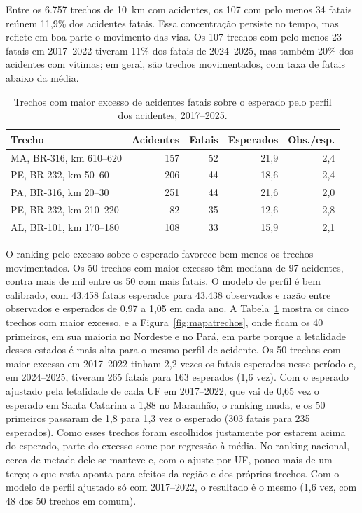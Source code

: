 \documentclass[12pt]{article}
\begin{document}
Entre os 6.757 trechos de 10~km com acidentes, os 107 com pelo menos 34 fatais reúnem 11,9\% dos acidentes fatais. Essa concentração persiste no tempo, mas reflete em boa parte o movimento das vias. Os 107 trechos com pelo menos 23 fatais em 2017--2022 tiveram 11\% dos fatais de 2024--2025, mas também 20\% dos acidentes com vítimas; em geral, são trechos movimentados, com taxa de fatais abaixo da média.

\begin{table}[ht]
\centering
\caption{Trechos com maior excesso de acidentes fatais sobre o esperado pelo perfil dos acidentes, 2017--2025.}
\label{tab:excesso}
\begin{tabular}{lrrrr}
\toprule
Trecho & Acidentes & Fatais & Esperados & Obs./esp. \\
\midrule
MA, BR-316, km 610--620 & 157 & 52 & 21,9 & 2,4 \\
PE, BR-232, km 50--60 & 206 & 44 & 18,6 & 2,4 \\
PA, BR-316, km 20--30 & 251 & 44 & 21,6 & 2,0 \\
PE, BR-232, km 210--220 & 82 & 35 & 12,6 & 2,8 \\
AL, BR-101, km 170--180 & 108 & 33 & 15,9 & 2,1 \\
\bottomrule
\end{tabular}
\end{table}

O ranking pelo excesso sobre o esperado favorece bem menos os trechos movimentados. Os 50 trechos com maior excesso têm mediana de 97 acidentes, contra mais de mil entre os 50 com mais fatais. O modelo de perfil é bem calibrado, com 43.458 fatais esperados para 43.438 observados e razão entre observados e esperados de 0,97 a 1,05 em cada ano. A Tabela~\ref{tab:excesso} mostra os cinco trechos com maior excesso, e a Figura~\ref{fig:mapatrechos}, onde ficam os 40 primeiros, em sua maioria no Nordeste e no Pará, em parte porque a letalidade desses estados é mais alta para o mesmo perfil de acidente. Os 50 trechos com maior excesso em 2017--2022 tinham 2,2 vezes os fatais esperados nesse período e, em 2024--2025, tiveram 265 fatais para 163 esperados (1,6 vez). Com o esperado ajustado pela letalidade de cada UF em 2017--2022, que vai de 0,65 vez o esperado em Santa Catarina a 1,88 no Maranhão, o ranking muda, e os 50 primeiros passaram de 1,8 para 1,3 vez o esperado (303 fatais para 235 esperados). Como esses trechos foram escolhidos justamente por estarem acima do esperado, parte do excesso some por regressão à média. No ranking nacional, cerca de metade dele se manteve e, com o ajuste por UF, pouco mais de um terço; o que resta aponta para efeitos da região e dos próprios trechos. Com o modelo de perfil ajustado só com 2017--2022, o resultado é o mesmo (1,6 vez, com 48 dos 50 trechos em comum).
\end{document}
